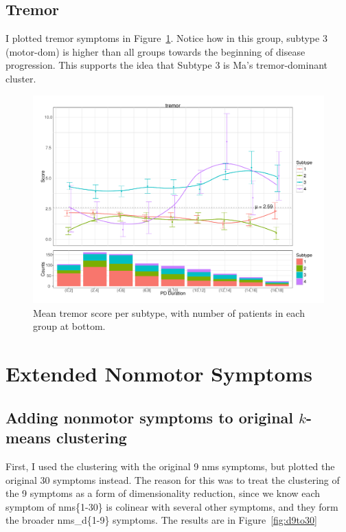 \documentclass[10pt]{article}
\begin{document}
\begin{multicols}{2}
\subsection{Tremor}

I plotted tremor symptoms in Figure~\ref{fig:tremor-multi}. Notice how in this group, subtype 3
(motor-dom) is higher than all groups towards the beginning of disease progression. This supports
the idea that Subtype 3 is Ma's \cite{ma15} tremor-dominant cluster.

\begin{figure}[t]
  \centering
  \includegraphics[width=0.8\linewidth]{tremor-multi-durat-counts.pdf}
  \caption{Mean tremor score per subtype, with number of patients in each group at
  bottom.}
  \label{fig:tremor-multi}
\end{figure}


\section{Extended Nonmotor Symptoms}
\label{sec:nms30}

\subsection{Adding nonmotor symptoms to original $k$-means clustering}

First, I used the clustering with the original 9 nms symptoms, but plotted the original 30 symptoms
instead. The reason for this was to treat the clustering of the 9 symptoms as a form of
dimensionality reduction, since we know each symptom of nms\{1-30\} is colinear with several other
symptoms, and they form the broader nms\_d\{1-9\} symptoms. The results are in
Figure~\ref{fig:d9to30}


\end{multicols}
\end{document}
